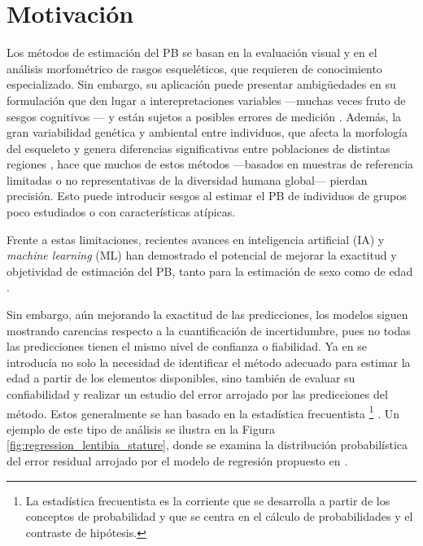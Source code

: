 \section{Motivación}

Los métodos de estimación del PB se basan en la evaluación visual y en el análisis morfométrico de rasgos esqueléticos, que requieren de conocimiento especializado. Sin embargo, su aplicación puede presentar ambigüedades en su formulación que den lugar a interepretaciones variables ---muchas veces fruto de sesgos cognitivos \cite{nakhaeizadeh2014, cooper2019}--- y están sujetos a posibles errores de medición \cite{langley2018}. Además, la gran variabilidad genética y ambiental entre individuos, que afecta la morfología del esqueleto y genera diferencias significativas entre poblaciones de distintas regiones \cite{ubelaker2017}, hace que muchos de estos métodos ---basados en muestras de referencia limitadas o no representativas de la diversidad humana global--- pierdan precisión. Esto puede introducir sesgos al estimar el PB de individuos de grupos poco estudiados o con características atípicas.

Frente a estas limitaciones, recientes avances en inteligencia artificial (IA) y \textit{machine learning} (ML) han demostrado el potencial de mejorar la exactitud y objetividad de estimación del PB, tanto para la estimación de sexo \cite{curate2017, darmawan2015, pinto2016} como de edad \cite{kim2017, larson2018, lee2017}.

Sin embargo, aún mejorando la exactitud de las predicciones, los modelos siguen mostrando carencias respecto a la cuantificación de incertidumbre, pues no todas las predicciones tienen el mismo nivel de confianza o fiabilidad. Ya en \cite{ferrante2009} se introducía no solo la necesidad de identificar el método adecuado para estimar la edad a partir de los elementos disponibles, sino también de evaluar su confiabilidad y realizar un estudio del error arrojado por las predicciones del método. Estos generalmente se han basado en la estadística frecuentista%
\footnote{
    La estadística frecuentista es la corriente que se desarrolla a partir de los conceptos de probabilidad y que se centra en el cálculo de probabilidades y el contraste de hipótesis.
}
\cite{verma2020, stepanovsky2024, heinrich2024}. Un ejemplo de este tipo de análisis se ilustra en la Figura \ref{fig:regression_lentibia_stature}, donde se examina la distribución probabilística del error residual arrojado por el modelo de regresión propuesto en \cite{verma2020}.

